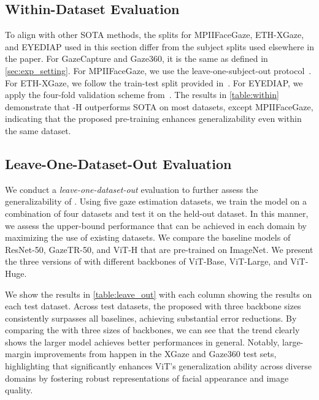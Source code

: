\subsection{Within-Dataset Evaluation}\label{sec:within}
To align with other SOTA methods, the splits for MPIIFaceGaze, ETH-XGaze, and EYEDIAP used in this section differ from the subject splits used elsewhere in the paper.
For GazeCapture and Gaze360, it is the same as defined in \cref{sec:exp_setting}.
For MPIIFaceGaze, we use the leave-one-subject-out protocol~\cite{abdelrahman2023l2cs,shi2024agent,ververas20253dgazenet}. 
For ETH-XGaze, we follow the train-test split provided in~\cite{ververas20253dgazenet}.
For EYEDIAP, we apply the four-fold validation scheme from~\cite{cheng2022gaze,cheng2024appearance}. 
The results in \cref{table:within} demonstrate that \methodname-H outperforms SOTA on most datasets, except MPIIFaceGaze, indicating that the proposed pre-training enhances generalizability even within the same dataset.





\subsection{Leave-One-Dataset-Out Evaluation}\label{sec:leave_one_out}


We conduct a \textit{leave-one-dataset-out} evaluation to further assess the generalizability of \methodname.
Using five gaze estimation datasets, we train the model on a combination of four datasets and test it on the held-out dataset. 
In this manner, we assess the upper-bound performance that can be achieved in each domain by maximizing the use of existing datasets.
We compare the baseline models of ResNet-50, GazeTR-50, and ViT-H that are pre-trained on ImageNet.
We present the three versions of \methodname with different backbones of ViT-Base, ViT-Large, and ViT-Huge.


We show the results in \cref{table:leave_out} with each column showing the results on each test dataset. 
Across test datasets, the proposed \methodname with three backbone sizes consistently surpasses all baselines, achieving substantial error reductions. 
By comparing the \methodname with three sizes of backbones, we can see that the trend clearly shows the larger model achieves better performances in general.
Notably, large-margin improvements from \methodname happen in the XGaze and Gaze360 test sets, highlighting that \methodname significantly enhances ViT’s generalization ability across diverse domains by fostering robust representations of facial appearance and image quality.



